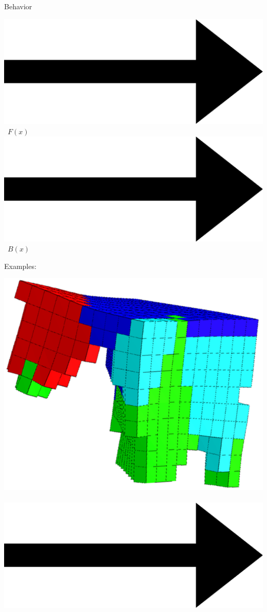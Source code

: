 \documentclass{beamer}
\begin{document}
\begin{frame}{Behavior}
\begin{center}
\includegraphics[height=0.05\textheight]{figures/Arrow_east.eps}\	
{\huge $F(x)$ }\	
\includegraphics[height=0.05\textheight]{figures/Arrow_east.eps}\	
{\huge $B(x)$ }\\
\end{center}
\vspace{0.25cm}
Examples:\\
\begin{center}
\includegraphics[height=0.15\textheight]{figures/unshacklingEvolutionFigure2.png}\	
\includegraphics[height=0.05\textheight]{figures/Arrow_east.eps}\	

\end{center}
\end{frame}
\end{document}
